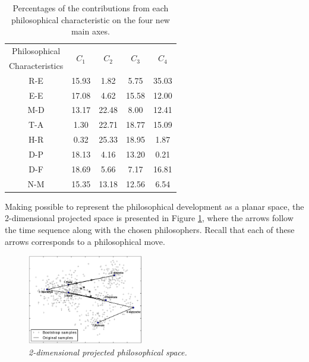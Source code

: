 \documentclass[%
 aip,
 jmp,%
 amsmath,amssymb,
 reprint,%
]{revtex4-1}
\begin{document}

\begin{table}%
\caption{\label{tab:Deviates}Percentages of
the contributions from each philosophical characteristic on the four new main axes.  }
\begin{tabular}{|c||c|c|c|c|}
\hline
Philosophical & \multirow{2}{*}{$C_1$} & \multirow{2}{*}{$C_2$} & \multirow{2}{*}{$C_3$} & \multirow{2}{*}{$C_4$}\\
Characteristics & & & & \\
\hline
R-E & 15.93   &  1.82 &  5.75 & 35.03 \\
E-E & 17.08   &  4.62 & 15.58 & 12.00 \\
M-D & 13.17   & 22.48 &  8.00 & 12.41 \\
T-A &  1.30   & 22.71 & 18.77 & 15.09 \\
H-R &  0.32   & 25.33 & 18.95 &  1.87 \\
D-P & 18.13   &  4.16 & 13.20 &  0.21 \\
D-F & 18.69   &  5.66 &  7.17 & 16.81 \\
N-M & 15.35   & 13.18 & 12.56 &  6.54 \\
\hline

\end{tabular}
\end{table}

Making possible to represent the philosophical development as a planar space, the 2-dimensional projected space is presented in Figure
\ref{fig:pca}, where the arrows follow the time sequence along with
the chosen philosophers.  Recall that each of these arrows corresponds
to a philosophical move.  



\begin{figure}
        \begin{center}
                \includegraphics[width=0.45\textwidth]{pca_filosofos_novo}
        \end{center}
        \caption{\it 2-dimensional projected philosophical space.}
        \label{fig:pca}
\end{figure}
\end{document}
